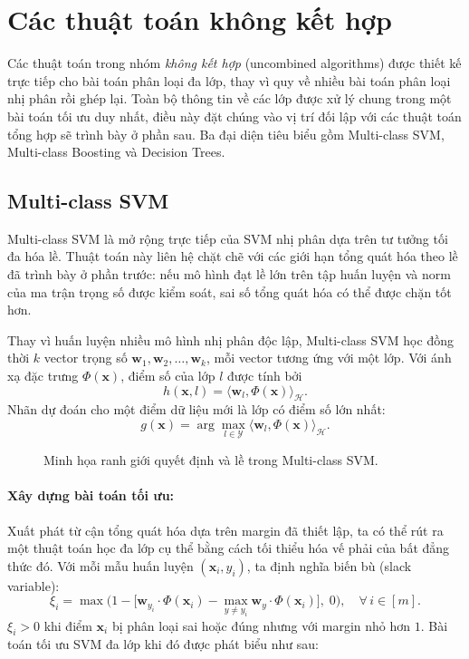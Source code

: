 \section{Các thuật toán không kết hợp}
\label{sec:uncombined}

Các thuật toán trong nhóm \textit{không kết hợp} (uncombined algorithms) được thiết kế trực tiếp cho bài toán phân loại đa lớp, thay vì quy về nhiều bài toán phân loại nhị phân rồi ghép lại. Toàn bộ thông tin về các lớp được xử lý chung trong một bài toán tối ưu duy nhất, điều này đặt chúng vào vị trí đối lập với các thuật toán tổng hợp sẽ trình bày ở phần sau. Ba đại diện tiêu biểu gồm Multi-class SVM, Multi-class Boosting và Decision Trees.

\subsection{Multi-class SVM}
\label{sssec:multiclass_svm}

Multi-class SVM là mở rộng trực tiếp của SVM nhị phân dựa trên tư tưởng tối đa hóa lề. Thuật toán này liên hệ chặt chẽ với các giới hạn tổng quát hóa theo lề đã trình bày ở phần trước: nếu mô hình đạt lề lớn trên tập huấn luyện và norm của ma trận trọng số được kiểm soát, sai số tổng quát hóa có thể được chặn tốt hơn.

Thay vì huấn luyện nhiều mô hình nhị phân độc lập, Multi-class SVM học đồng thời $k$ vector trọng số $\bm{w}_1,\bm{w}_2,\ldots,\bm{w}_k$, mỗi vector tương ứng với một lớp. Với ánh xạ đặc trưng $\Phi(\bm{x})$, điểm số của lớp $l$ được tính bởi
\[
  h(\bm{x},l)=\langle \bm{w}_l,\Phi(\bm{x})\rangle_{\mathcal{H}}.
\]
Nhãn dự đoán cho một điểm dữ liệu mới là lớp có điểm số lớn nhất:
\[
  g(\bm{x})=\arg\max_{l\in\mathcal{Y}}\langle \bm{w}_l,\Phi(\bm{x})\rangle_{\mathcal{H}}.
\]

\begin{figure}[H]
\centering
\resizebox{0.98\textwidth}{!}{}
\caption{Minh họa ranh giới quyết định và lề trong Multi-class SVM.}
\label{fig:svm-margin}
\end{figure}

\paragraph{Xây dựng bài toán tối ưu:}
Xuất phát từ cận tổng quát hóa dựa trên margin đã thiết lập, ta có thể rút ra một thuật toán học đa lớp cụ thể bằng cách tối thiểu hóa vế phải của bất đẳng thức đó. Với mỗi mẫu huấn luyện $(\bm{x}_i, y_i)$, ta định nghĩa biến bù (slack variable):
\[
    \xi_i = \max\!\bigl(1 - \bigl[\bm{w}_{y_i} \cdot \Phi(\bm{x}_i)
            - \max_{y \neq y_i} \bm{w}_y \cdot \Phi(\bm{x}_i)\bigr],\; 0\bigr),
    \quad \forall\, i \in [m].
\]
$\xi_i > 0$ khi điểm $\bm{x}_i$ bị phân loại sai hoặc đúng nhưng với margin nhỏ hơn $1$. Bài toán tối ưu SVM đa lớp khi đó được phát biểu như sau:

